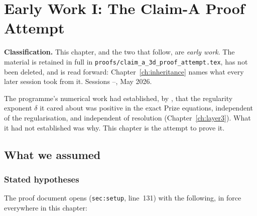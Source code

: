 \chapter{Early Work I: The Claim-A Proof Attempt}
\label{ch:claim-a}

\begin{record}
\textbf{Classification.} This chapter, and the two that follow, are
\emph{early work}. The material is retained in full in
\texttt{proofs/claim\_a\_3d\_proof\_attempt.tex}, has not been deleted, and is
read forward: Chapter~\ref{ch:inheritance} names what every later session
took from it. Sessions --, May 2026.
\end{record}

The programme's numerical work had established, by , that the
regularity exponent \(\delta\) it cared about was positive in the exact Prize
equations, independent of the regularisation, and independent of resolution
(Chapter~\ref{ch:layer3}). What it had not established was why. This chapter
is the attempt to prove it.

\section{What we assumed}
\label{sec:claima-assumed}

\subsection{Stated hypotheses}

The proof document opens (\texttt{sec:setup}, line~131) with the following, in
force everywhere in this chapter:

